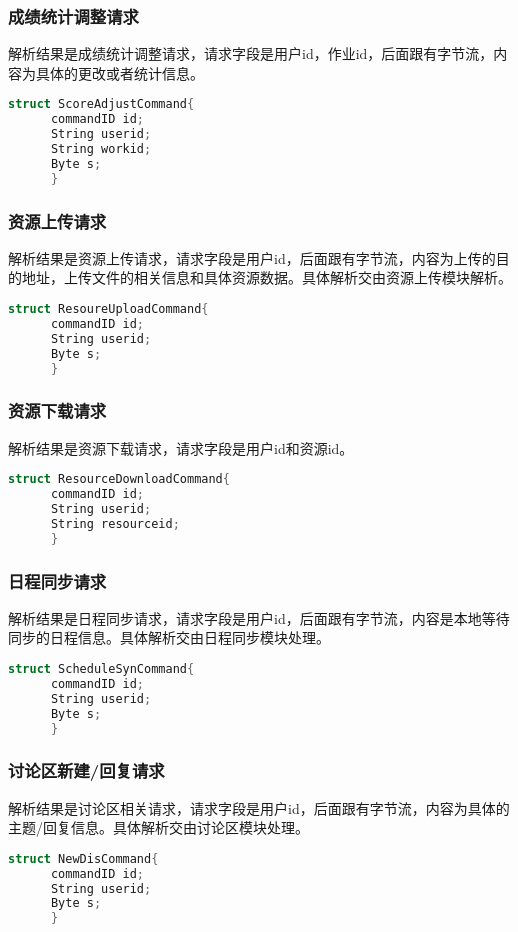     \subsubsection{成绩统计调整请求}
    解析结果是成绩统计调整请求，请求字段是用户id，作业id，后面跟有字节流，内容为具体的更改或者统计信息。
    \begin{lstlisting}[language=C,caption=成绩统计调整请求]
      struct ScoreAdjustCommand{
      commandID id;
      String userid;
      String workid;
      Byte s;
      }
    \end{lstlisting}
    \subsubsection{资源上传请求}
    解析结果是资源上传请求，请求字段是用户id，后面跟有字节流，内容为上传的目的地址，上传文件的相关信息和具体资源数据。具体解析交由资源上传模块解析。
    \begin{lstlisting}[language=C,caption=资源上传请求]
      struct ResoureUploadCommand{
      commandID id;
      String userid;
      Byte s;
      }
    \end{lstlisting}
    \subsubsection{资源下载请求}
    解析结果是资源下载请求，请求字段是用户id和资源id。
    \begin{lstlisting}[language=C,caption=资源下载请求]
      struct ResourceDownloadCommand{
      commandID id;
      String userid;
      String resourceid;
      }
    \end{lstlisting}
    \subsubsection{日程同步请求}
    解析结果是日程同步请求，请求字段是用户id，后面跟有字节流，内容是本地等待同步的日程信息。具体解析交由日程同步模块处理。
    \begin{lstlisting}[language=C,caption=日程同步请求]
      struct ScheduleSynCommand{
      commandID id;
      String userid;
      Byte s;
      }
    \end{lstlisting}
    \subsubsection{讨论区新建/回复请求}
    解析结果是讨论区相关请求，请求字段是用户id，后面跟有字节流，内容为具体的主题/回复信息。具体解析交由讨论区模块处理。
    \begin{lstlisting}[language=C,caption=讨论区新建/回复请求]
      struct NewDisCommand{
      commandID id;
      String userid;
      Byte s;
      }
    \end{lstlisting}
